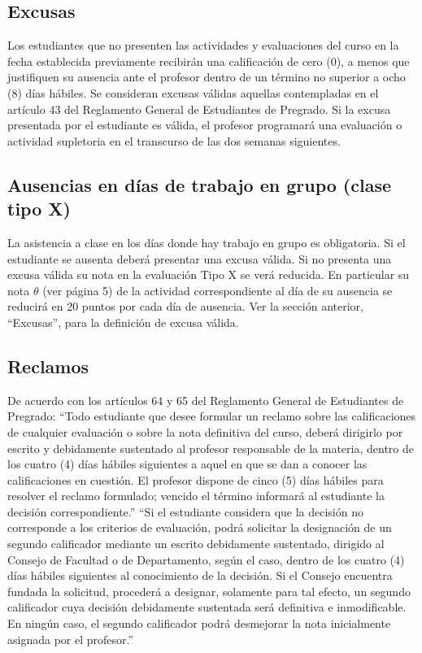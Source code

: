 \documentclass[11pt]{article}
\begin{document}
\subsection*{Excusas}

Los estudiantes que no presenten las actividades y evaluaciones del curso en la fecha establecida previamente recibirán una calificación de cero (0), a menos que justifiquen su ausencia ante el profesor dentro de un término no superior a ocho (8) días hábiles. Se consideran excusas válidas aquellas contempladas en el artículo 43 del Reglamento General de Estudiantes de Pregrado. Si la excusa presentada por el estudiante es válida, el profesor programará una evaluación o actividad supletoria en el transcurso de las dos semanas siguientes.

\subsection*{Ausencias en días de trabajo en grupo (clase tipo X)}

La asistencia a clase en los días donde hay trabajo en grupo es obligatoria. Si el estudiante se ausenta deberá presentar una excusa válida. Si no presenta una excusa válida su nota en la evaluación Tipo X se verá reducida. En particular su nota $\theta$ (ver página 5) de la actividad correspondiente al día de su ausencia se reducirá en 20 puntos por cada día de ausencia. Ver la sección anterior, “Excusas”, para la definición de excusa válida.

\subsection*{Reclamos}

De acuerdo con los artículos 64 y 65 del Reglamento General de Estudiantes de Pregrado:
“Todo estudiante que desee formular un reclamo sobre las calificaciones de cualquier evaluación o sobre la nota definitiva del curso, deberá dirigirlo por escrito y debidamente sustentado al profesor responsable de la materia, dentro de los cuatro (4) días hábiles siguientes a aquel en que se dan a conocer las calificaciones en cuestión. El profesor dispone de cinco (5) días hábiles para resolver el reclamo formulado; vencido el término informará al estudiante la decisión correspondiente.”
“Si el estudiante considera que la decisión no corresponde a los criterios de evaluación, podrá solicitar la designación de un segundo calificador mediante un escrito debidamente sustentado, dirigido al Consejo de Facultad o de Departamento, según el caso, dentro de los cuatro (4) días hábiles siguientes al conocimiento de la decisión. Si el Consejo encuentra fundada la solicitud, procederá a designar, solamente para tal efecto, un segundo calificador cuya decisión debidamente sustentada será definitiva e inmodificable. En ningún caso, el segundo calificador podrá desmejorar la nota inicialmente asignada por el profesor.”
\end{document}
